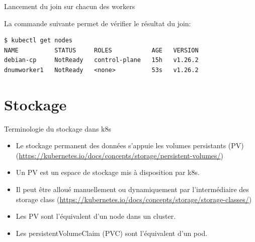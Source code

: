 
\begin{frame}[fragile]{Lancement du join sur chacun des workers}

La commande suivante permet de vérifier le résultat du join:
\begin{tiny}
\begin{Verbatim}[commandchars=\&\@\@]
$ kubectl get nodes
NAME          STATUS     ROLES           AGE   VERSION
debian-cp     NotReady   control-plane   15h   v1.26.2
dnumworker1   NotReady   <none>          53s   v1.26.2

\end{Verbatim}
\end{tiny}

\end{frame}


\section{Stockage}


\begin{frame}[shrink=8,fragile]{Terminologie du stockage dans k8s}

\begin{itemize}
   \item Le stockage permanent des données s'appuie les volumes persistants (PV) (\url{https://kubernetes.io/docs/concepts/storage/persistent-volumes/})
   \item Un PV est un espace de stockage mis à disposition par k8s.
   \item Il peut être alloué manuellement ou dynamiquement par l'intermédiaire des storage class (\url{https://kubernetes.io/docs/concepts/storage/storage-classes/})
   \item Les PV sont l'équivalent d'un node dans un cluster.
   \item Les persistentVolumeClaim (PVC) sont l'équivalent d'un pod.
\end{itemize}

\end{frame}


